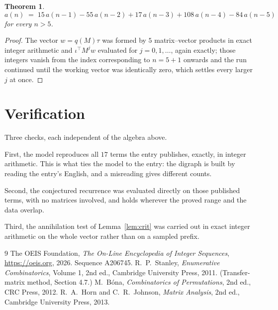 \documentclass[11pt,a4paper]{article}
\theoremstyle{plain}
\newtheorem{theorem}{Theorem}
\theoremstyle{definition}
\begin{document}
\begin{theorem}
\[
a(n)\;=\;15\,a(n-1) - 55\,a(n-2) + 17\,a(n-3) + 108\,a(n-4) - 84\,a(n-5)
\]
for every $n>5$.
\end{theorem}

\begin{proof}
The vector $w=q(M)\tau$ was formed by $5$ matrix--vector products in exact integer
arithmetic and $\iota^{\!\top}M^{j}w$ evaluated for $j=0,1,\dots$, again exactly; those
integers vanish from the index corresponding to $n=5+1$ onwards and the run continued
until the working vector was identically zero, which settles every larger $j$ at once.
\end{proof}

\section{Verification}

Three checks, each independent of the algebra above.

First, the model reproduces all $17$ terms the entry publishes, exactly, in integer
arithmetic. This is what ties the model to the entry: the digraph is built by reading the
entry's English, and a misreading gives different counts.

Second, the conjectured recurrence was evaluated directly on those published terms, with no
matrices involved, and holds wherever the proved range and the data overlap.

Third, the annihilation test of Lemma~\ref{lem:crit} was carried out in exact integer
arithmetic on the whole vector rather than on a sampled prefix.

\begin{thebibliography}{9}
 The OEIS Foundation, \emph{The On-Line Encyclopedia of Integer
Sequences}, \url{https://oeis.org}, 2026. Sequence A206745.
 R.~P.~Stanley, \emph{Enumerative Combinatorics}, Volume 1, 2nd ed.,
Cambridge University Press, 2011. (Transfer-matrix method, Section 4.7.)
 M.~B\'ona, \emph{Combinatorics of Permutations}, 2nd ed., CRC
Press, 2012.
 R.~A.~Horn and C.~R.~Johnson, \emph{Matrix Analysis}, 2nd ed., Cambridge
University Press, 2013.
\end{thebibliography}
\end{document}
